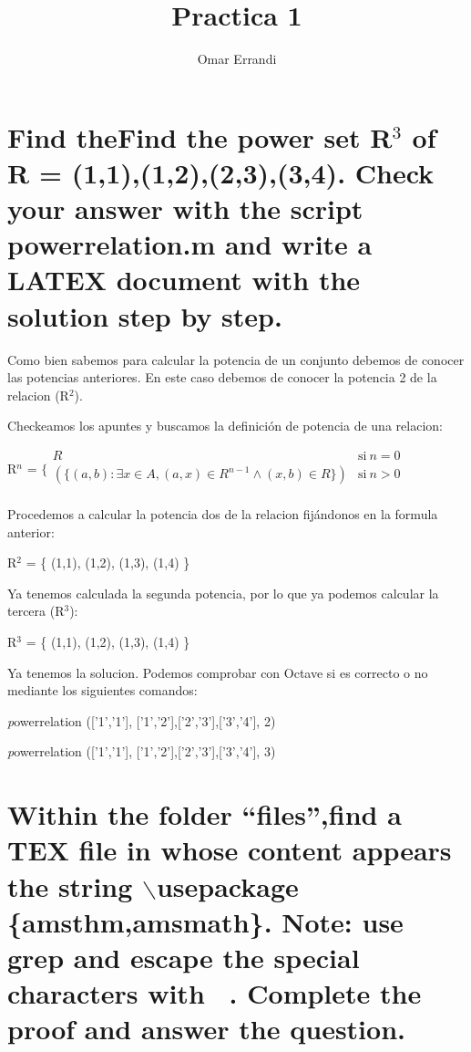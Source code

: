 \documentclass{article}
\title{\textbf{Practica 1}}
\author{Omar Errandi}
\date{}
\begin{document}
\maketitle

\section{Find theFind  the  power  set
R$^3$ of R = {(1,1),(1,2),(2,3),(3,4)}.   Check  your  answer with the script powerrelation.m and write a LATEX document with the solution step by step.}

	Como bien sabemos para calcular la potencia de un conjunto debemos de conocer las potencias anteriores. En este caso debemos de conocer la potencia 2 de la relacion (R$^2$).

Checkeamos los apuntes y buscamos la definición de potencia de una  relacion:

R$^n$ = $\Biggl\{$$\begin{array}{ll}
		 R      & \mathrm{si\ } n = 0 \\
		 (\{ (a,b) : \exists x \in A, (a,x)\in R^{n-1}  \wedge (x,b)\in R \}) & \mathrm{si\ }  n > 0 \\
		 
	       \end{array}$



Procedemos a calcular la potencia dos de la relacion fijándonos en la formula anterior:

R$^2$ = \{ (1,1), (1,2), (1,3), (1,4) \}

Ya tenemos calculada la segunda potencia, por lo que ya podemos calcular la tercera (R$^3$):

R$^3$ = \{ (1,1), (1,2), (1,3), (1,4) \}

Ya tenemos la solucion. Podemos comprobar con Octave si es correcto o no mediante los siguientes comandos:


\emph powerrelation ({['1','1'], ['1','2'],['2','3'],['3','4']}, 2)

\emph powerrelation ({['1','1'], ['1','2'],['2','3'],['3','4']}, 3) 












\section{Within the folder “files”,find a TEX file in whose content appears the string  $\backslash$usepackage \{amsthm,amsmath\}.   Note: use grep and  escape  the  special characters with \ .  Complete the proof and answer the question.
}
\end{document}
